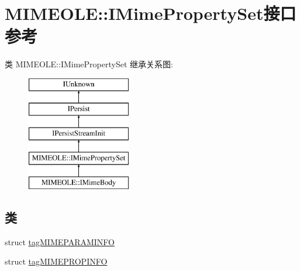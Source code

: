 \hypertarget{interface_m_i_m_e_o_l_e_1_1_i_mime_property_set}{}\section{M\+I\+M\+E\+O\+LE\+:\+:I\+Mime\+Property\+Set接口 参考}
\label{interface_m_i_m_e_o_l_e_1_1_i_mime_property_set}
类 M\+I\+M\+E\+O\+LE\+:\+:I\+Mime\+Property\+Set 继承关系图\+:\begin{figure}[H]
\begin{center}
\leavevmode
\includegraphics[height=5.000000cm]{interface_m_i_m_e_o_l_e_1_1_i_mime_property_set}
\end{center}
\end{figure}
\subsection*{类}
\begin{DoxyCompactItemize}
\item 
struct \hyperlink{struct_m_i_m_e_o_l_e_1_1_i_mime_property_set_1_1tag_m_i_m_e_p_a_r_a_m_i_n_f_o}{tag\+M\+I\+M\+E\+P\+A\+R\+A\+M\+I\+N\+FO}
\item 
struct \hyperlink{struct_m_i_m_e_o_l_e_1_1_i_mime_property_set_1_1tag_m_i_m_e_p_r_o_p_i_n_f_o}{tag\+M\+I\+M\+E\+P\+R\+O\+P\+I\+N\+FO}
\end{DoxyCompactItemize}

